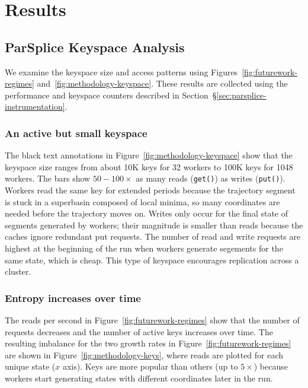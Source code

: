 \section{Results}
\label{sec:results}

\subsection{ParSplice Keyspace Analysis}
\label{sec:parsplice-keyspace-analysis}

We examine the keyspace size and access patterns using
Figures~\ref{fig:futurework-regimes} and~\ref{fig:methodology-keyspace}. These
results are collected using the performance and keyspace counters described in
Section~\S\ref{sec:parsplice-instrumentation}.

\subsubsection*{An active but small keyspace} The black text annotations in
Figure~\ref{fig:methodology-keyspace} show that the keyspace size ranges from
about 10K keys for 32 workers to 100K keys for 1048 workers.  The bars show
\(50-100\times\) as many reads (\texttt{get()}) as writes (\texttt{put()}).
Workers read the same key for extended periods because the trajectory segment
is stuck in a superbasin composed of local minima, so many coordinates are
needed before the trajectory moves on. Writes only occur for the final state of
segments generated by workers; their magnitude is smaller than reads because
the caches ignore redundant put requests. The number of read and write requests
are highest at the beginning of the run when workers generate segements for the
same state, which is cheap. This type of keyspace encourages replication across
a cluster.  

\subsubsection*{Entropy increases over time} The reads per second in
Figure~\ref{fig:futurework-regimes} show that the number of requests decreases
and the number of active keys increases over time. The resulting imbalance for
the two growth rates in Figure~\ref{fig:futurework-regimes} are shown in
Figure~\ref{fig:methodology-keys}, where reads are plotted for each unique
state (\(x\) axis). Keys are more popular than others (up to \(5\times\))
because workers start generating states with different coordinates later in the
run.

